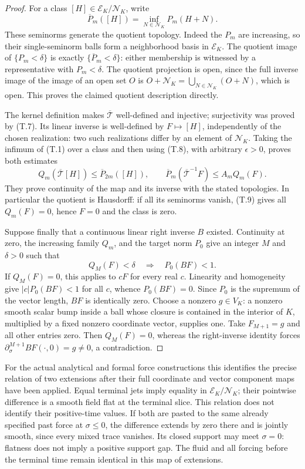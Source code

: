 \documentclass[10pt,a4paper]{article}
\newcommand{\E}{\mathcal E_K}
\newcommand{\N}{\mathcal N_K}
\begin{document}
\begin{proof}
For a class $[H]\in\E/\N$, write
\[
 \overline P_m([H])=\inf_{N\in\N}P_m(H+N).
\]
These seminorms generate the quotient topology. Indeed the $P_m$ are
increasing, so their single-seminorm balls form a neighborhood basis in
$\E$. The quotient image of $\{P_m<\delta\}$ is exactly
$\{\overline P_m<\delta\}$: either membership is witnessed by a
representative with $P_m<\delta$. The quotient projection is open, since
the full inverse image of the image of an open set $O$ is
$O+\N=\bigcup_{N\in\N}(O+N)$, which is open. This proves the claimed
quotient description directly.

The kernel definition makes $\overline{\mathcal T}$ well-defined and
injective; surjectivity was proved by (T.7). Its linear inverse is
well-defined by $F\mapsto[H]$, independently of the chosen realization:
two such realizations differ by an element of $\N$. Taking the infimum
of (T.1) over a class and then using (T.8), with arbitrary $\epsilon>0$,
proves both estimates
\[
 Q_m(\overline{\mathcal T}[H])\le\overline P_{2m}([H]),\qquad
 \overline P_m(\overline{\mathcal T}^{-1}F)\le A_mQ_m(F).
 \tag{T.9}
\]
They prove continuity of the map and its inverse with the stated topologies.
In particular the quotient is Hausdorff: if all its seminorms vanish,
(T.9) gives all $Q_m(F)=0$, hence $F=0$ and the class is zero.

Suppose finally that a continuous linear right inverse $B$ existed.
Continuity at zero, the increasing family $Q_m$, and the target norm $P_0$
give an integer $M$ and $\delta>0$ such that
\[
 Q_M(F)<\delta\quad\Longrightarrow\quad P_0(BF)<1.
\]
If $Q_M(F)=0$, this applies to $cF$ for every real $c$. Linearity and
homogeneity give $|c|P_0(BF)<1$ for all $c$, whence $P_0(BF)=0$.
Since $P_0$ is the supremum of the vector length, $BF$ is identically zero.
Choose a nonzero $g\in V_K$: a nonzero smooth scalar bump inside a ball
whose closure is contained in the interior of $K$, multiplied by a fixed
nonzero coordinate vector, supplies one. Take $F_{M+1}=g$ and all other
entries zero. Then $Q_M(F)=0$, whereas the right-inverse identity forces
$\partial_\sigma^{M+1}BF(\cdot,0)=g\ne0$, a contradiction.
\end{proof}

For the actual analytical and formal force constructions this identifies the
precise relation of two extensions after their full coordinate and vector
component maps have been applied. Equal terminal jets imply equality in
$\E/\N$; their pointwise difference is a smooth field flat at the terminal
slice. This relation does not identify their positive-time values. If both
are pasted to the same already specified past force at $\sigma\le0$, the
difference extends by zero there and is jointly smooth, since every mixed
trace vanishes. Its closed support may meet $\sigma=0$: flatness does not
imply a positive support gap. The fluid and all forcing before the terminal
time remain identical in this map of extensions.
\end{document}

